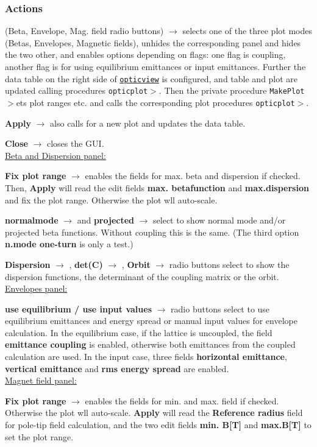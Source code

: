 \documentclass[12pt]{article}
\newcommand\code[1]{{\tt #1}}
\newcommand{\ofld}[1]{\colorbox{black!15}{{\bf #1}}}
\newcommand{\ofldx}[1]{\colorbox{black!15}{(#1)}}
\newcommand\guico[1]{{\color{blue}\code{#1}}}
\newcommand{\unico}[1]{{\color{burntorange}\code{#1}}}
\newcommand{\evcod}[2]{\ofld{#1} $\rightarrow$ \guico{#2}}
\newcommand{\evcodx}[2]{\ofldx{#1} $\rightarrow$ \guico{#2}}
\newcommand{\prcod}[2]{\opauni{#1}$>$\unico{#2}}
\newcommand{\opagui}[1]{\colorbox{blue!20}{\code{#1}}}
\newcommand{\ogui}[1]{\hyperref[#1]{\opagui{#1}}}
\newcommand{\opauni}[1]{\colorbox{orange!30}{\code{#1}}}
\newcommand{\act}[1]{\subsubsection*{Actions} #1}
\begin{document}
\act{
\evcodx{Beta, Envelope, Mag. field radio buttons}{rmodClick} selects one of the three plot modes (Betas, Envelopes, Magnetic fields), unhides the corresponding panel and hides the two other, and enables options depending on flags: one flag is coupling, another flag is for using equilibrium emittances or input emittances. Further the data table on the right side of \ogui{opticview} is configured, and table and plot are updated calling procedures \prcod{opticplot}{InitBetaTab,FillBetaTab}. Then the private procedure \prcod{MakePlot} sets plot ranges etc. and calls the corresponding plot procedures \prcod{opticplot}{PlotBeta,EnvPlot,MagPLot}.

\evcod{Apply}{butgoClick} also calls for a new plot and updates the data table.

\evcod{Close}{butcanClick} closes the GUI.\\

\underline{Beta and Dispersion panel:}

\evcod{Fix plot range}{cbxbetamaxClick} enables the fields for max. beta and dispersion if checked. Then, \ofld{Apply} will read the edit fields \ofld{max. betafunction} and \ofld{max.dispersion} and fix the plot range. Otherwise the plot wll auto-scale.

\evcod{normalmode}{chk\_betabChange} and \evcod{projected}{chk\_betxyChange} select to show normal mode and/or projected beta functions. Without coupling this is the same. (The third option \ofld{n.mode one-turn} is only a test.)

\evcod{Dispersion}{rbu\_dspChange}, \evcod{det(C)}{rbu\_cdetChange}, \evcod{Orbit}{rbu\_orbiChange} radio buttons select to show the dispersion functions, the determinant of the coupling matrix or the orbit.\\

\underline{Envelopes panel:}

\evcod{use equilibrium / use input values}{rbuClick} radio buttons select to use equilibrium emittances and energy spread or manual input values for envelope calculation. In the equilibrium case, if the lattice is uncoupled, the field \ofld{emittance coupling} is enabled, otherwise both emittances from the coupled calculation are used. In the input case, three fields \ofld{horizontal emittance}, \ofld{vertical emittance} and \ofld{rms energy spread} are enabled.\\

\underline{Magnet field panel:}

\evcod{Fix plot range}{chk\_bfieldfixClick} enables the fields for min. and max. field if checked. Otherwise the plot wll auto-scale. \ofld{Apply} will read the \ofld{Reference radius} field for pole-tip field calculation, and the two edit fields \ofld{min. B[T]} and \ofld{max.B[T]} to set the plot range. 

}
\end{document}
